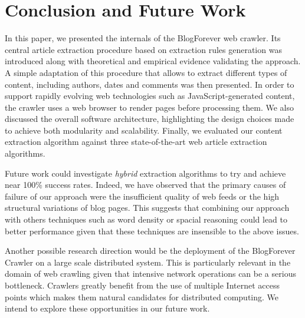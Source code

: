 \section{Conclusion and Future Work}
\label{conclusionandfuturework}

In this paper, we presented the internals of the BlogForever web crawler. Its central article extraction procedure based on extraction rules generation was introduced along with theoretical and empirical evidence validating the approach. A simple adaptation of this procedure that allows to extract different types of content, including authors, dates and comments was then presented. In order to support rapidly evolving web technologies such as JavaScript-generated content, the crawler uses a web browser to render pages before processing them. We also discussed the overall software architecture, highlighting the design choices made to achieve both modularity and scalability. Finally, we evaluated our content extraction algorithm against three state-of-the-art web article extraction algorithms.


Future work could investigate \emph{hybrid} extraction algorithms to try and achieve near 100\% success rates. Indeed, we have observed that the primary causes of failure of our approach were the insufficient quality of web feeds or the high structural variations of blog pages. This suggests that combining our approach with others techniques such as word density or spacial reasoning could lead to better performance given that these techniques are insensible to the above issues.

Another possible research direction would be the deployment of the BlogForever Crawler on a large scale distributed system. This is particularly relevant in the domain of web crawling given that intensive network operations can be a serious bottleneck. Crawlers greatly benefit from the use of multiple Internet access points which makes them natural candidates for distributed computing. We intend to explore these opportunities in our future work.
